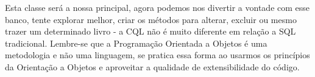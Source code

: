 Esta classe será a nossa principal, agora podemos nos divertir a vontade com esse banco, tente explorar melhor, criar os métodos para alterar, excluir ou mesmo trazer um determinado livro - a CQL não é muito diferente em relação a SQL tradicional. Lembre-se que a Programação Orientada a Objetos é uma metodologia e não uma linguagem, se pratica essa forma ao usarmos os princípios da Orientação a Objetos e aproveitar a qualidade de extensibilidade do código.
